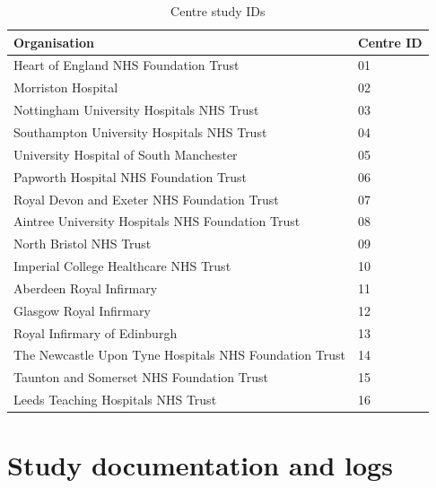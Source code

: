 \documentclass[a4paper,10pt]{article}
\begin{document}
\begin{table}[] %
    \centering
    \begin{tabular}{ll}
    \textbf{Organisation}                                           & \textbf{Centre ID} \\
        \midrule 
        Heart of England NHS Foundation Trust                  & 01        \\
        Morriston Hospital                                     & 02        \\
        Nottingham University Hospitals NHS Trust              & 03        \\
        Southampton University Hospitals NHS Trust             & 04        \\
        University Hospital of South Manchester                & 05        \\
        Papworth Hospital NHS Foundation Trust                 & 06        \\
        Royal Devon and Exeter NHS Foundation Trust            & 07        \\
        Aintree University Hospitals NHS Foundation Trust      & 08        \\
        North Bristol NHS Trust                                & 09        \\
        Imperial College Healthcare NHS Trust                  & 10        \\
        Aberdeen Royal Infirmary                               & 11        \\
        Glasgow Royal Infirmary                                & 12        \\
        Royal Infirmary of Edinburgh                           & 13        \\
        The Newcastle Upon Tyne Hospitals NHS Foundation Trust & 14        \\
        Taunton and Somerset NHS Foundation Trust              & 15        \\
        Leeds Teaching Hospitals NHS Trust                     & 16        \\ 
        \bottomrule 
    \end{tabular}
    \caption{Centre study IDs}

\end{table}

\section{Study documentation and logs}
\end{document}
